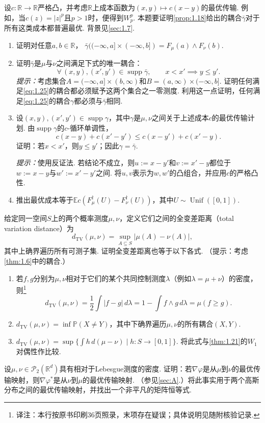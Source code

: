 \begin{exercise}\label{exer:8}\label{exer:1.8}
设$c:\mathbb R\to\mathbb R$严格凸，并考虑$\mathbb R$上成本函数为$(x,y)\mapsto c(x-y)$的最优传输. 例如，当$c(z)=|z|^p$且$p>1$时，便得到$W_p^p$. 本题要证明\autoref{prop:1.18}给出的耦合$\bar\gamma$对于所有这类成本都普遍最优. 背景见\autoref{sec:1.7}.
\begin{enumerate}
\renewcommand{\labelenumi}{(\alph{enumi})}
\item 证明对任意$a,b\in\mathbb R$，
$\bar\gamma(({-\infty},a]\times({-\infty},b])=F_\mu(a)\wedge F_\nu(b)$.
\item 证明$\bar\gamma$是$\mu$与$\nu$之间满足下式的唯一耦合：
\begin{equation}\label{eq:1.25}
\forall\,(x,y),(x',y')\in\operatorname{supp}\bar\gamma,
\qquad x<x'\implies y\leq y'.
\end{equation}
\emph{提示：}考虑集合$A=({-\infty},a]\times(b,\infty)$和$B=(a,\infty)\times({-\infty},b]$. 证明任何满足\eqref{eq:1.25}的耦合都必须赋予这两个集合之一零测度. 利用这一点证明，任何满足\eqref{eq:1.25}的耦合$\gamma$都必须与$\bar\gamma$相同.
\item 设$(x,y),(x',y')\in\operatorname{supp}\gamma$，其中$\gamma$是$\mu,\nu$之间关于上述成本$c$的最优传输计划. 由$\operatorname{supp}\gamma$的$c$-循环单调性，
$$
c(x-y)+c(x'-y')\leq c(x-y')+c(x'-y).
$$
证明：若$x<x'$，则$y\leq y'$；因此$\gamma=\bar\gamma$.

\emph{提示：}使用反证法. 若结论不成立，则$u:=x-y'$和$v:=x'-y$都位于$w:=x-y$与$w':=x'-y'$之间. 将$u,v$表示为$w,w'$的凸组合，并应用$c$的严格凸性.
\item 推出最优成本等于$\mathbb E c(F_\mu^\dagger(U)-F_\nu^\dagger(U))$，其中$U\sim\operatorname{Unif}([0,1])$.
\end{enumerate}
\end{exercise}

\begin{exercise}\label{exer:9}\label{exer:1.9}
给定同一空间$S$上的两个概率测度$\mu,\nu$，定义它们之间的全变差距离（total variation distance）为
$$
d_{\mathrm{TV}}(\mu,\nu)=\sup_{A\subseteq S}|\mu(A)-\nu(A)|,
$$
其中上确界遍历所有可测子集. 证明全变差距离也等于以下各式. （提示：考虑\autoref{thm:1.6}中的耦合.）
\begin{enumerate}
\renewcommand{\labelenumi}{(\alph{enumi})}
\item 若$f,g$分别为$\mu,\nu$相对于它们的某个共同控制测度$\lambda$（例如$\lambda=\mu+\nu$）的密度，则\footnote{译注：本行按原书印刷36页照录，末项存在疑误；具体说明见随附核验记录.}
$$
d_{\mathrm{TV}}(\mu,\nu)=\frac12\int|f-g|\,d\lambda
=1-\int f\wedge g\,d\lambda=\mu(f\geq g).
$$
\item $d_{\mathrm{TV}}(\mu,\nu)=\inf\mathbb P(X\neq Y)$，其中下确界遍历$\mu,\nu$的所有耦合$(X,Y)$.
\item $d_{\mathrm{TV}}(\mu,\nu)=\sup\{\int h\,d(\mu-\nu)\mid h:S\to[0,1]\}$. 将此式与\autoref{thm:1.21}的$W_1$对偶性作比较.
\end{enumerate}
\end{exercise}

\begin{exercise}\label{exer:10}\label{exer:1.10}
设$\mu,\nu\in\mathcal P_2(\mathbb R^d)$具有相对于Lebesgue测度的密度. 证明：若$\nabla\varphi$是从$\mu$到$\nu$的最优传输映射，则$\nabla\varphi^*$是从$\nu$到$\mu$的最优传输映射. （参见\autoref{sec:A}.）将此事实用于两个高斯分布之间的最优传输映射，并找出一个非平凡的矩阵恒等式.
\end{exercise}
